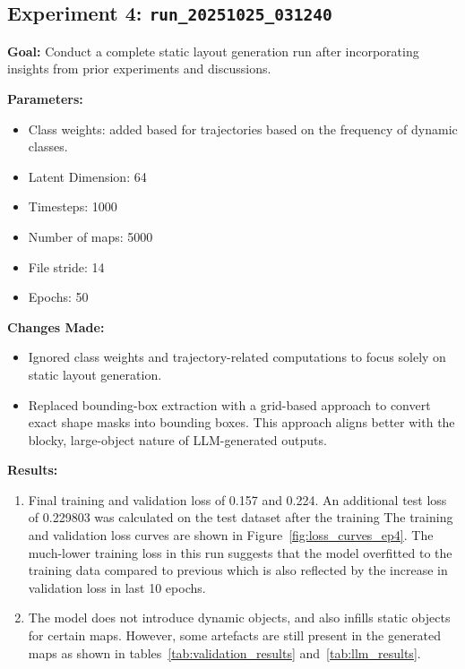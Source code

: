 \documentclass{article}
\begin{document}
\subsection{Experiment 4: \texttt{run\_20251025\_031240}}

\textbf{Goal:} Conduct a complete static layout generation run after incorporating insights from prior experiments and discussions.

\textbf{Parameters:}
\begin{itemize}
    \item Class weights: added based for trajectories based on the frequency of dynamic classes.
    \item Latent Dimension: 64
    \item Timesteps: 1000
    \item Number of maps: 5000 
    \item File stride: 14
    \item Epochs: 50
\end{itemize}

\textbf{Changes Made:}
\begin{itemize}
    \item Ignored class weights and trajectory-related computations to focus solely on static layout generation.
    \item Replaced bounding-box extraction with a grid-based approach to convert exact shape masks into bounding boxes. This approach aligns better with the blocky, large-object nature of LLM-generated outputs.
\end{itemize}


\textbf{Results:}
\begin{enumerate}
    \item Final training and validation loss of 0.157 and 0.224. An additional test loss of 0.229803 was calculated on the test dataset after the training The training and validation loss curves are shown in Figure~\ref{fig:loss_curves_ep4}. The much-lower training loss in this run suggests that the model overfitted to the training data compared to previous which is also reflected by the increase in validation loss in last 10 epochs.

    \item The model does not introduce dynamic objects, and also infills static objects for certain maps. However, some artefacts are still present in the generated maps as shown in tables~\ref{tab:validation_results} and~\ref{tab:llm_results}.
\end{enumerate}
\end{document}
